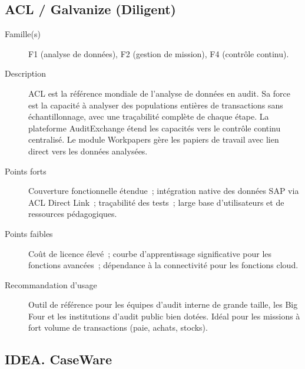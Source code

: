 \subsection*{ACL / Galvanize (Diligent)}

\begin{description}
  \item[Famille(s)] F1 (analyse de données), F2 (gestion de mission),
        F4 (contrôle continu).
  \item[Description] ACL est la référence mondiale de l'analyse de données
        en audit. Sa force est la capacité à analyser des populations entières
        de transactions sans échantillonnage, avec une traçabilité complète
        de chaque étape. La plateforme AuditExchange étend les capacités
        vers le contrôle continu centralisé. Le module Workpapers gère les
        papiers de travail avec lien direct vers les données analysées.
  \item[Points forts] Couverture fonctionnelle étendue~; intégration
        native des données SAP via ACL Direct Link~; traçabilité des tests~;
        large base d'utilisateurs et de ressources pédagogiques.
  \item[Points faibles] Coût de licence élevé~; courbe d'apprentissage
        significative pour les fonctions avancées~; dépendance à la
        connectivité pour les fonctions cloud.
  \item[Recommandation d'usage] Outil de référence pour les équipes d'audit
        interne de grande taille, les Big Four et les institutions d'audit
        public bien dotées. Idéal pour les missions à fort volume de
        transactions (paie, achats, stocks).
\end{description}

\subsection*{IDEA. CaseWare}

